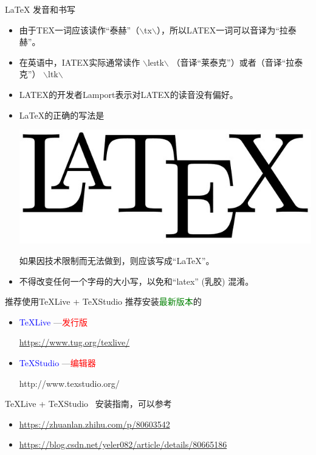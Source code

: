 \documentclass[13pt]{ctexbeamer}
\newcommand{\red}[1]{\textcolor{red}{#1}}
\newcommand{\blue}[1]{\textcolor{blue}{#1}}
\newcommand{\green}[1]{\textcolor{green}{#1}}
\begin{document}
\begin{frame}{LaTeX 发音和书写}
	\begin{itemize}
\item 	由于TEX一词应该读作“泰赫”（$\backslash$t\textepsilon x$\backslash$），所以LATEX一词可以音译为“拉泰赫”。
\item 
	在英语中，IATEX实际通常读作
$\backslash$le\i t\textepsilon k$\backslash$
（音译“莱泰克”）或者（音译“拉泰克”）
$\backslash$l\textscripta\textlengthmark t\textepsilon k$\backslash$
\item 
	LATEX的开发者Lamport表示对LATEX的读音没有偏好。
		\end{itemize}
	\vspace{15pt}
		\begin{itemize}
\item 
LaTeX的正确的写法是
\begin{center}
\includegraphics[scale=0.08]{LATEX.jpg}
\end{center}
如果因技术限制而无法做到，则应该写成“LaTeX”。
\item 
不得改变任何一个字母的大小写，以免和“latex” (乳胶) 混淆。
	\end{itemize}

	
	

	
	

\end{frame}

    
    \begin{frame}{推荐使用TeXLive + TeXStudio }
    	推荐安装\green{最新版本}的
    	
    	\begin{itemize}
    		\item \blue{TeXLive}  ---\red{发行版}
    		
    		\href{https://www.tug.org/texlive/}{https://www.tug.org/texlive/}
    		
    		
    		
    		\item \blue{TeXStudio}    ---\red{编辑器}
    		
    		http://www.texstudio.org/
    	\end{itemize}
    	
    	{TeXLive} + {TeXStudio}   ~安装指南，可以参考
    	\begin{itemize}
    		\item 	\href{https://zhuanlan.zhihu.com/p/80603542}{https://zhuanlan.zhihu.com/p/80603542}
    		\item \href{https://blog.csdn.net/yeler082/article/details/80665186}{https://blog.csdn.net/yeler082/article/details/80665186}
    	\end{itemize}
    \end{frame}
\end{document}

